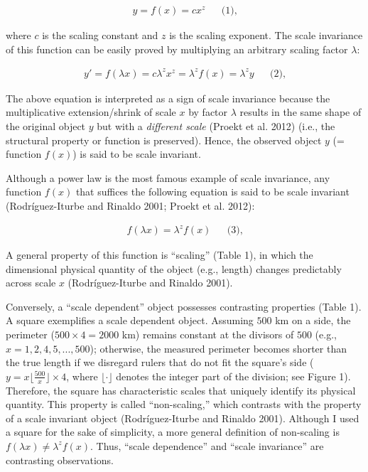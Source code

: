 \documentclass[
  12pt,
]{article}
\begin{document}
\[
\begin{aligned}
y = f(x) = cx^z &&\text{(1),}
\end{aligned}
\]

where \(c\) is the scaling constant and \(z\) is the scaling exponent. The scale invariance of this function can be easily proved by multiplying an arbitrary scaling factor \(\lambda\):

\[
\begin{aligned}
y'=f(\lambda x)=c\lambda^zx^z = \lambda^z f(x) = \lambda^z y  &&\text{(2),}
\end{aligned}
\]

The above equation is interpreted as a sign of scale invariance because the multiplicative extension/shrink of scale \(x\) by factor \(\lambda\) results in the same shape of the original object \(y\) but with a \emph{different scale} (Proekt et al. 2012) (i.e., the structural property or function is preserved). Hence, the observed object \(y\) (= function \(f(x)\)) is said to be scale invariant.

Although a power law is the most famous example of scale invariance, any function \(f(x)\) that suffices the following equation is said to be scale invariant (Rodríguez-Iturbe and Rinaldo 2001; Proekt et al. 2012):

\[
\begin{aligned}
f(\lambda x) = \lambda^z f(x) &&\text{(3),}
\end{aligned}
\]

A general property of this function is ``scaling'' (Table 1), in which the dimensional physical quantity of the object (e.g., length) changes predictably across scale \(x\) (Rodríguez-Iturbe and Rinaldo 2001).

Conversely, a ``scale dependent'' object possesses contrasting properties (Table 1). A square exemplifies a scale dependent object. Assuming \(500\) km on a side, the perimeter (\(500 \times 4 =2000\) km) remains constant at the divisors of \(500\) (e.g., \(x = 1, 2, 4, 5,...,500\)); otherwise, the measured perimeter becomes shorter than the true length if we disregard rulers that do not fit the square's side (\(y = x \lfloor \frac{500}{x} \rfloor \times 4\), where \(\lfloor \cdot \rfloor\) denotes the integer part of the division; see Figure 1). Therefore, the square has characteristic scales that uniquely identify its physical quantity. This property is called ``non-scaling,'' which contrasts with the property of a scale invariant object (Rodríguez-Iturbe and Rinaldo 2001). Although I used a square for the sake of simplicity, a more general definition of non-scaling is \(f(\lambda x) \ne \lambda^zf(x)\). Thus, ``scale dependence'' and ``scale invariance'' are contrasting observations.
\end{document}
